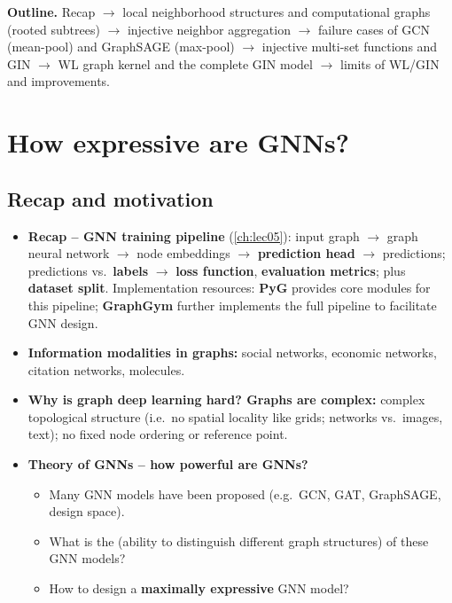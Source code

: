 \textbf{Outline.} Recap $\to$ local neighborhood structures and computational
graphs (rooted subtrees) $\to$ injective neighbor aggregation $\to$ failure cases
of GCN (mean-pool) and GraphSAGE (max-pool) $\to$ injective multi-set functions
and GIN $\to$ WL graph kernel and the complete GIN model $\to$ limits of WL/GIN
and improvements.

\section{How expressive are GNNs?}\label{sec:lec06-expressive}

\subsection{Recap and motivation}\label{sec:lec06-recap}

\begin{itemize}
  \item \textbf{Recap -- GNN training pipeline} (\cref{ch:lec05}): input graph
    $\to$ graph neural network $\to$ node embeddings $\to$ \textbf{prediction
    head} $\to$ predictions; predictions vs.\ \textbf{labels} $\to$ \textbf{loss
    function}, \textbf{evaluation metrics}; plus \textbf{dataset split}.
    Implementation resources: \textbf{PyG} provides core modules for this
    pipeline; \textbf{GraphGym} further implements the full pipeline to
    facilitate GNN design.
  \item \textbf{Information modalities in graphs:} social networks, economic
    networks, citation networks, molecules.
  \item \textbf{Why is graph deep learning hard? Graphs are complex:} complex
    topological structure (i.e.\ no spatial locality like grids; networks vs.\
    images, text); no fixed node ordering or reference point.
  \item \textbf{Theory of GNNs -- how powerful are GNNs?}
    \begin{itemize}
      \item Many GNN models have been proposed (e.g.\ GCN, GAT, GraphSAGE, design
        space).
      \item What is the  (ability to distinguish
        different graph structures) of these GNN models?
      \item How to design a \textbf{maximally expressive} GNN model?
    \end{itemize}
\end{itemize}

